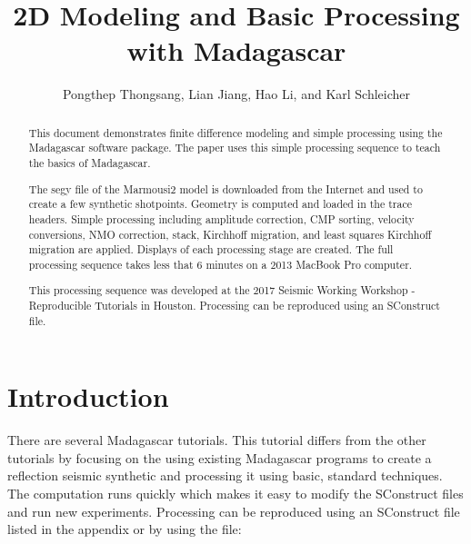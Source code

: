 
\title{2D Modeling and Basic Processing with Madagascar}   
\author{Pongthep Thongsang, Lian Jiang, Hao Li, and Karl Schleicher}


\address{
k\_schleicher@hotmail.com \\
John A. and Katherine G. Jackson School of Geosciences \\
The University of Texas at Austin \\
University Station, Box X \\
Austin, TX 78713-8924}

\maketitle

\begin{abstract}
This document demonstrates finite difference modeling and simple processing
using the Madagascar software package.  The paper uses this simple processing 
sequence to teach the basics of Madagascar. 

The segy file of the Marmousi2 model is downloaded from the Internet and used
to create a few synthetic shotpoints.  Geometry is computed and loaded in the
trace headers.   Simple processing including amplitude correction, CMP
sorting, velocity conversions, NMO correction, stack, Kirchhoff migration, and
least squares Kirchhoff migration are applied.  Displays of each processing
stage are created.  The full processing sequence takes less that 6 minutes on
a 2013 MacBook Pro computer. 

This processing sequence was developed at the 2017 Seismic Working Workshop - 
Reproducible Tutorials in Houston.  Processing can be reproduced using an 
SConstruct file.

\end{abstract}

\section{Introduction}
There are several Madagascar tutorials.  This tutorial differs from the other 
tutorials by focusing on the using existing Madagascar programs to create 
a reflection seismic synthetic and processing it using basic, standard 
techniques.  The computation runs quickly which makes it easy to 
modify the SConstruct files and run new experiments.  Processing can be 
reproduced using an SConstruct file listed in the appendix or by using the file:

